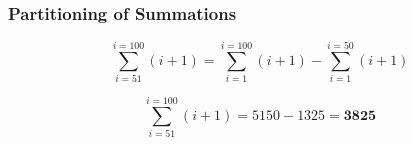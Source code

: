 \documentclass{beamer}
\begin{document}
\begin{frame}
\frametitle{Partitioning of Summations}
\large

\[ \sum^{i=100}_{i=51} (i+1) = \sum^{i=100}_{i=1} (i+1)  - \sum^{i=50}_{i=1}(i+1)   \]

\[ \sum^{i=100}_{i=51} (i+1)  = 5150 - 1325 =\boldsymbol{3825} \]
\end{frame}

\end{document}
